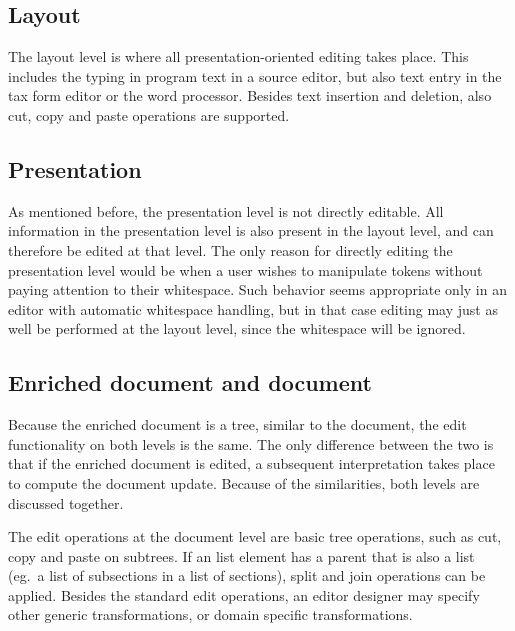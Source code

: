  
%																
\subsection{Layout}

The layout level is where all presentation-oriented editing takes place. This includes the typing in program text in a source editor, but also text entry in the tax form editor or the word processor. Besides text insertion and deletion, also cut, copy and paste operations are supported.
 
%																
\subsection{Presentation}

As mentioned before, the presentation level is not directly editable. All information in the presentation level is also present in the layout level, and can therefore be edited at that level. The only reason for directly editing the presentation level would be when a user wishes to manipulate tokens without paying attention to their whitespace. Such behavior seems appropriate only in an editor with automatic whitespace handling, but in that case editing may just as well be performed at the layout level, since the whitespace will be ignored. 
 
 
%																
\subsection{Enriched document and document}

Because the enriched document is a tree, similar to the document, the edit functionality on both levels is the same. The only difference between the two is that if the enriched document is edited, a subsequent interpretation takes place to compute the document update. Because of the similarities, both levels are discussed together.

The edit operations at the document level are basic tree operations, such as cut, copy and paste on subtrees. If an list element has a parent that is also a list (eg.\ a list of subsections in a list of sections), split and join operations can be applied. Besides the standard edit operations, an editor designer may specify other generic transformations, or domain specific transformations.

